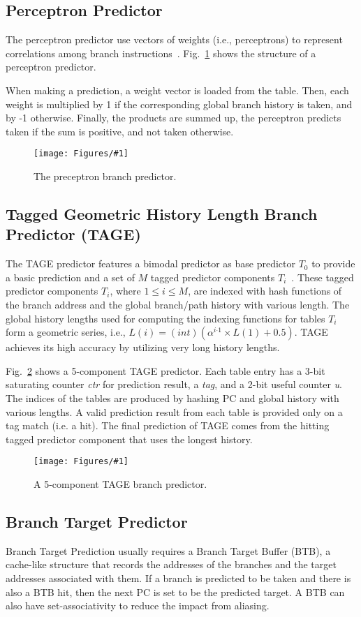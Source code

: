 \documentclass[conference]{IEEEtran}
\newcommand{\kfig}[4]{ %
        \begin{figure}[!t]
        \centering
        \texttt{[image: Figures/\#1]}
        \vspace{-1mm}
        \caption{#3}
        \label{#2}
        \end{figure}
}
\begin{document}
\subsection{Perceptron Predictor}
\label{sec:scheme:perceptron}
The perceptron predictor use vectors of weights (i.e., perceptrons) to represent correlations among branch instructions~\cite{perceptron}. Fig.~\ref{fig:perceptron} shows the structure of a perceptron predictor. 

When making a prediction, a weight vector is loaded from the table. Then, each weight is multiplied by 1 if the corresponding global branch history is taken, and by -1 otherwise. Finally, the products are summed up, the perceptron predicts taken if the sum is positive, and not taken otherwise.
\kfig{perceptron.pdf}{fig:perceptron}{The preceptron branch predictor.}{angle = 0, trim = 1in 3.5in 2in 1in, clip, width=0.4\textwidth}

\subsection{Tagged Geometric History Length Branch Predictor (TAGE)}
\label{sec:scheme:tage}
The TAGE predictor features a bimodal predictor as base predictor $T_0$ to provide a basic prediction and a set of $M$ tagged predictor components $T_i$~\cite{tage}. These tagged predictor components $T_i$, where $1\leq i\leq M$, are indexed with hash functions of the branch address and the global branch/path history with various length. The global history lengths used for computing the indexing functions for tables $T_i$ form a geometric series, i.e., $L(i) = (int)(\alpha^{i{}^{\_}1}\times L(1)+0.5)$. TAGE achieves its high accuracy by utilizing very long history lengths.

Fig.~\ref{fig:tage} shows a 5-component TAGE predictor. Each table entry has a 3-bit saturating counter \textit{ctr} for prediction result, a \textit{tag}, and a 2-bit useful counter \textit{u}. The indices of the tables are produced by hashing PC and global history with various lengths. A valid prediction result from each table is provided only on a tag match (i.e. a hit). The final prediction of TAGE comes from the hitting tagged predictor component that uses the longest history.
\kfig{tage.pdf}{fig:tage}{A 5-component TAGE branch predictor.}{angle = 0, trim = 0.6in 0.6in 0.4in 0.2in, clip, width=0.4\textwidth}


\subsection{Branch Target Predictor}
\label{sec:scheme:target}
Branch Target Prediction usually requires a Branch Target Buffer (BTB), a cache-like structure that records the addresses of the branches and the target addresses associated with them. If a branch is predicted to be taken and there is also a BTB hit, then the next PC is set to be the predicted target. A BTB can also have set-associativity to reduce the impact from aliasing.
\end{document}
